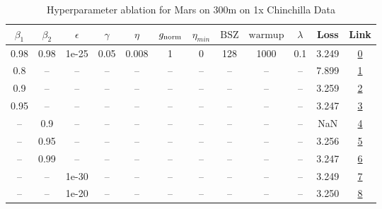 \begin{table}[H]
\centering
\caption{Hyperparameter ablation for Mars on 300m on 1x Chinchilla Data}
\label{tab:ablation_mars_300m_on_1x_chinchilla_data}
\begin{tabular}{cccccccccccc}
\toprule
$\beta_1$ & $\beta_2$ & $\epsilon$ & $\gamma$ & $\eta$ & $g_{\mathrm{norm}}$ & $\eta_{min}$ & $\mathrm{BSZ}$ & $\mathrm{warmup}$ & $\lambda$ & Loss & Link \\
\midrule
0.98 & 0.98 & 1e-25 & 0.05 & 0.008 & 1 & 0 & 128 & 1000 & 0.1 & 3.249 & \href{https://wandb.ai/marin-community/optimizer-scaling/runs/sweep-300m-6B-mars9c7f7elr0.008-wd0.1-minlr0-warmup1000-b10.98-b-f63232}{0} \\
\midrule
0.8 & -- & -- & -- & -- & -- & -- & -- & -- & -- & 7.899 & \href{https://wandb.ai/marin-community/optimizer-scaling/runs/sweep-300m-6B-mars51e60dlr0.008-wd0.1-minlr0-warmup1000-b10.8-b2-fcc8df}{1} \\
0.9 & -- & -- & -- & -- & -- & -- & -- & -- & -- & 3.259 & \href{https://wandb.ai/marin-community/optimizer-scaling/runs/sweep-300m-6B-mars9bd75elr0.008-wd0.1-minlr0-warmup1000-b10.9-b2-cab9f0}{2} \\
0.95 & -- & -- & -- & -- & -- & -- & -- & -- & -- & 3.247 & \href{https://wandb.ai/marin-community/optimizer-scaling/runs/sweep-300m-6B-mars328fcflr0.008-wd0.1-minlr0-warmup1000-b10.95-b-ce45f8}{3} \\
-- & 0.9 & -- & -- & -- & -- & -- & -- & -- & -- & NaN & \href{https://wandb.ai/marin-community/optimizer-scaling/runs/sweep-300m-6B-marsb65964lr0.008-wd0.1-minlr0-warmup1000-b10.98-b-e8240b}{4} \\
-- & 0.95 & -- & -- & -- & -- & -- & -- & -- & -- & 3.256 & \href{https://wandb.ai/marin-community/optimizer-scaling/runs/sweep-300m-6B-mars9f27e3lr0.008-wd0.1-minlr0-warmup1000-b10.98-b-a25628}{5} \\
-- & 0.99 & -- & -- & -- & -- & -- & -- & -- & -- & 3.247 & \href{https://wandb.ai/marin-community/optimizer-scaling/runs/sweep-300m-6B-mars4f9747lr0.008-wd0.1-minlr0-warmup1000-b10.98-b-fd94ca}{6} \\
-- & -- & 1e-30 & -- & -- & -- & -- & -- & -- & -- & 3.249 & \href{https://wandb.ai/marin-community/optimizer-scaling/runs/sweep-300m-6B-mars9c7f7elr0.008-wd0.1-minlr0-warmup1000-b10.98-b-f63232}{7} \\
-- & -- & 1e-20 & -- & -- & -- & -- & -- & -- & -- & 3.250 & \href{https://wandb.ai/marin-community/optimizer-scaling/runs/sweep-300m-6B-mars25812alr0.008-wd0.1-minlr0-warmup1000-b10.98-b-0e08ff}{8} \\

\end{tabular}
\end{table}
